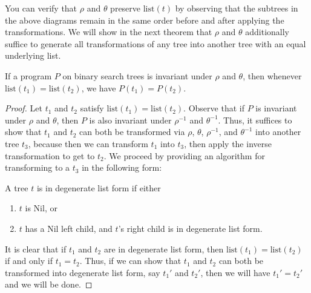 \documentclass{llncs}
\begin{document}
  You can verify that $\rho$ and $\theta$ preserve $\mathrm{list}(t)$
  by observing that the subtrees in the above diagrams remain in the same order
  before and after applying the transformations.
  We will show in the next theorem that $\rho$ and $\theta$ additionally suffice
  to generate all transformations of any tree into another tree with an equal
  underlying list.

  \begin{theorem}
    If a program $P$ on binary search trees is invariant under $\rho$
    and $\theta$, then whenever $\mathrm{list}(t_1) = \mathrm{list}(t_2)$,
    we have $P(t_1) = P(t_2)$.
  \end{theorem}
  \begin{proof}
    Let $t_1$ and $t_2$ satisfy $\mathrm{list}(t_1) = \mathrm{list}(t_2)$.
    Observe that if $P$ is invariant under $\rho$ and $\theta$,
    then $P$ is also invariant under $\rho^{-1}$ and $\theta^{-1}$.
    Thus, it suffices to show that $t_1$ and $t_2$ can both be transformed
    via $\rho$, $\theta$, $\rho^{-1}$, and $\theta^{-1}$ into another tree $t_3$,
    because then we can transform $t_1$ into $t_3$, then apply the inverse
    transformation to get to $t_2$.
    We proceed by providing an algorithm for transforming to a $t_3$
    in the following form:

    \begin{definition}
      A tree $t$ is in degenerate list form if either
      \begin{enumerate}
        \item $t$ is Nil, or
        \item $t$ has a Nil left child, and $t$'s right child is in degenerate
          list form.
      \end{enumerate}
    \end{definition}

    It is clear that if $t_1$ and $t_2$ are in degenerate list form, then
    $\mathrm{list}(t_1) = \mathrm{list}(t_2)$ if and only if $t_1 = t_2$.
    Thus, if we can show that $t_1$ and $t_2$ can both be transformed into
    degenerate list form, say $t_1'$ and $t_2'$, then we will have $t_1' = t_2'$
    and we will be done.


\end{proof}
\end{document}
